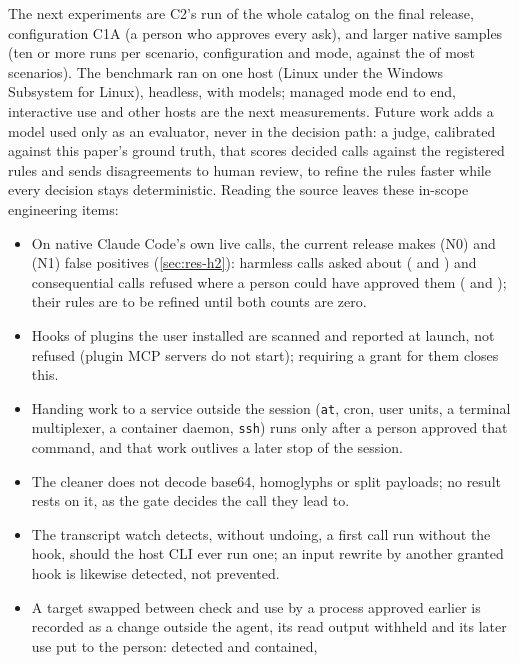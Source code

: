\documentclass[11pt]{article}
\begin{document}
The next experiments are C2's run of the whole catalog on the final
release, configuration C1A (a person who approves every ask), and larger native
samples (ten or more runs per scenario, configuration and mode, against
the \NativeTrialsPerGroup{} of most scenarios). The benchmark ran on one
host (Linux under the Windows Subsystem for Linux), headless, with
\ModelsMeasured{} models; managed mode end to end, interactive use and
other hosts are the next measurements. Future work adds a model used
only as an evaluator, never in the decision path: a judge, calibrated
against this paper's ground truth, that scores decided calls against
the registered rules and sends disagreements to human review, to
refine the rules faster while every decision stays deterministic.
Reading the source leaves these
in-scope engineering items:
\begin{itemize}[nosep]
\ifnum\numexpr\ReplayNativeFP+\ReplaySandboxFP\relax>0
\item On native Claude Code's own live calls, the current release makes
  \ReplayNativeFP{} (N0) and \ReplaySandboxFP{} (N1) false positives
  (\cref{sec:res-h2}): harmless calls asked about
  (\ReplayNativeFPHarmless{} and \ReplaySandboxFPHarmless{}) and
  consequential calls refused where a person could have approved them
  (\ReplayNativeFPConsequential{} and \ReplaySandboxFPConsequential{});
  their rules are to be refined until both counts are zero.
\fi
\item Hooks of plugins the user installed are scanned and reported at
  launch, not refused (plugin MCP servers do not start); requiring a
  grant for them closes this.
\item Handing work to a service outside the session (\texttt{at}, cron,
  user units, a terminal multiplexer, a container daemon, \texttt{ssh})
  runs only after a person approved that command, and that work outlives
  a later stop of the session.
\item The cleaner does not decode base64, homoglyphs or split payloads;
  no result rests on it, as the gate decides the call they lead to.
\item The transcript watch detects, without undoing, a first call run
  without the hook, should the host CLI ever run one; an input rewrite
  by another granted hook is likewise detected, not prevented.
\item A target swapped between check and use by a process approved
  earlier is recorded as a change outside the agent, its read output
  withheld and its later use put to the person: detected and contained,

\end{itemize}
\end{document}
